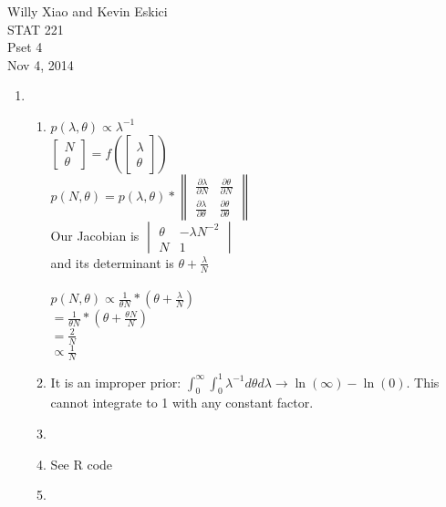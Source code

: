 \documentclass[paper=a4, fontsize=11pt]{scrartcl}
\newcommand{\parens}[1]{ \left( #1 \right) }
\begin{document}
\noindent Willy Xiao and Kevin Eskici \\ STAT 221 \\Pset 4\\ Nov 4, 2014
\begin{enumerate}
  \item
    \begin{enumerate}[1]
      
      \item   
      $p(\lambda, \theta) \propto \lambda^{-1}$\\
      $\begin{bmatrix} N \\ \theta \end{bmatrix} = f\parens{\begin{bmatrix} \lambda \\ \theta \end{bmatrix}}$\\
      $p(N, \theta) = p(\lambda, \theta) * \begin{Vmatrix}  \frac{\partial \lambda}{\partial N} &  \frac{\partial \theta}{\partial N} \\ \frac{\partial \lambda}{\partial \theta} &  \frac{\partial \theta}{\partial \theta} \end{Vmatrix}$\\
      Our Jacobian is $\begin{vmatrix} \theta & {-\lambda N^{-2}} \\N & 1 \end{vmatrix}$\\
      and its determinant is $\theta + \frac{\lambda}{N}$\\\\
      $p(N, \theta) \propto \frac{1}{\theta N} * (\theta + \frac{\lambda}{N})$\\
      $= \frac{1}{\theta N} * (\theta + \frac{\theta N}{N})$\\
      $= \frac{2}{N}$\\
      $\propto \frac{1}{N}$



      \item It is an improper prior: $\int_0^\infty{\int_0^1{\lambda^{-1}}}d\theta d\lambda \rightarrow \ln(\infty) - \ln(0)$. This cannot integrate to 1 with any constant factor.
	
	\item   
	
	\item See R code
	
	\item
      
    \end{enumerate}
\end{enumerate}
\end{document}
